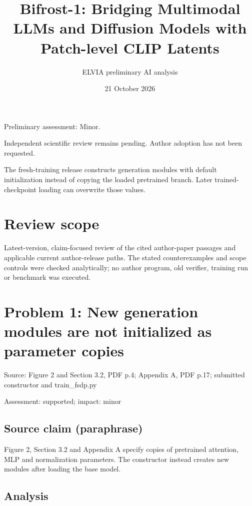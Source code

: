 \documentclass[11pt]{article}
\begin{document}
\title{Bifrost-1: Bridging Multimodal LLMs and Diffusion Models with Patch-level CLIP Latents}

\author{ELVIA preliminary AI analysis}\date{21 October 2026}\maketitle

Preliminary assessment: Minor.\par

Independent scientific review remains pending. Author adoption has not been requested.

The fresh-training release constructs generation modules with default initialization instead of copying the loaded pretrained branch. Later trained-checkpoint loading can overwrite those values.

\section*{Review scope}

Latest-version, claim-focused review of the cited author-paper passages and applicable current author-release paths. The stated counterexamples and scope controls were checked analytically; no author program, old verifier, training run or benchmark was executed.

\section*{Problem 1: New generation modules are not initialized as parameter copies}

Source: Figure 2 and Section 3.2, PDF p.4; Appendix A, PDF p.17; submitted constructor and train\_fsdp.py

Assessment: supported; impact: minor

\subsection*{Source claim (paraphrase)}

Figure 2, Section 3.2 and Appendix A specify copies of pretrained attention, MLP and normalization parameters. The constructor instead creates new modules after loading the base model.

\subsection*{Analysis}
\end{document}
